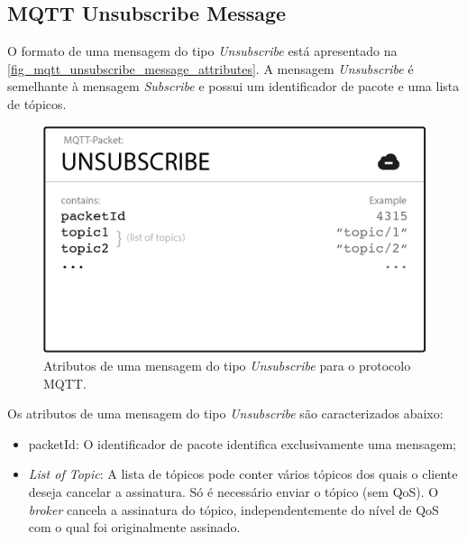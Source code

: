 \subsection{MQTT Unsubscribe Message}\label{subsection_mqtt_unsubscribe_message}
O formato de uma mensagem do tipo \textit{Unsubscribe} está apresentado na \autoref{fig_mqtt_unsubscribe_message_attributes}. A mensagem  \textit{Unsubscribe} é semelhante à mensagem  \textit{Subscribe} e possui um identificador de pacote e uma lista de tópicos.
\begin{figure}[htb]
	\begin{center}
		\caption{Atributos de uma mensagem do tipo \textit{Unsubscribe} para o protocolo MQTT.}\label{fig_mqtt_unsubscribe_message_attributes}
		\includegraphics[scale=0.5]{Imagens/mqtt_unsubscribe_message_attributes.png}
	\end{center}
\end{figure}

Os atributos de uma mensagem do tipo \textit{Unsubscribe} são caracterizados abaixo:
\begin{itemize}
	\item packetId: O identificador de pacote identifica exclusivamente uma mensagem;
	\item \textit{List of Topic}: A lista de tópicos pode conter vários tópicos dos quais o cliente deseja cancelar a assinatura. Só é necessário enviar o tópico (sem QoS). O \textit{broker} cancela a assinatura do tópico, independentemente do nível de QoS com o qual foi originalmente assinado.
\end{itemize}


